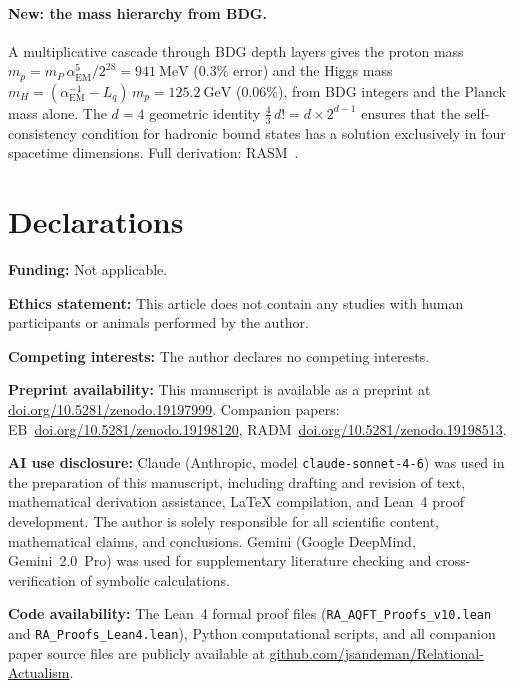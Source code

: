 \documentclass[11pt,a4paper]{article}
\theoremstyle{plain}
\theoremstyle{definition}
\theoremstyle{remark}
\begin{document}
\paragraph{New: the mass hierarchy from BDG.}
A multiplicative cascade through BDG depth layers gives the proton mass
$m_p = m_P\,\alpha_{\mathrm{EM}}^5/2^{28} = 941~\mathrm{MeV}$
($0.3\%$ error) and the Higgs mass
$m_H = (\alpha_{\mathrm{EM}}^{-1} - L_q)\,m_p = 125.2~\mathrm{GeV}$
($0.06\%$), from BDG integers and the Planck mass alone. The $d = 4$
geometric identity $\frac{4}{3}\,d! = d \times 2^{d-1}$ ensures that the
self-consistency condition for hadronic bound states has a solution
exclusively in four spacetime dimensions. Full derivation:
RASM~\citep{Sandeman2026RASM}.


\section*{Declarations}
\textbf{Funding:} Not applicable.

\textbf{Ethics statement:} This article does not contain any studies with human participants or animals performed by the author.

\quad
\textbf{Competing interests:} The author declares no competing interests.

\textbf{Preprint availability:} This manuscript is available as a preprint at
\href{https://doi.org/10.5281/zenodo.19197999}{doi.org/10.5281/zenodo.19197999}.
Companion papers: EB~\href{https://doi.org/10.5281/zenodo.19198120}{doi.org/10.5281/zenodo.19198120}, RADM~\href{https://doi.org/10.5281/zenodo.19198513}{doi.org/10.5281/zenodo.19198513}.

\textbf{AI use disclosure:} Claude (Anthropic, model \texttt{claude-sonnet-4-6}) was used in the preparation of this manuscript, including drafting and revision of text, mathematical derivation assistance, \LaTeX{} compilation, and Lean~4 proof development. The author is solely responsible for all scientific content, mathematical claims, and conclusions. Gemini (Google DeepMind, Gemini~2.0~Pro) was used for supplementary literature checking and cross-verification of symbolic calculations.


\textbf{Code availability:} The Lean~4 formal proof files (\texttt{RA\_AQFT\_Proofs\_v10.lean} and \texttt{RA\_Proofs\_Lean4.lean}), Python computational scripts, and all companion paper source files are publicly available at \href{https://github.com/jsandeman/Relational-Actualism}{github.com/jsandeman/Relational-Actualism}.
\end{document}
